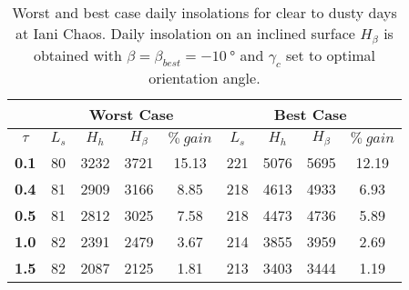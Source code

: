 \begin{table}[h]
\footnotesize
\centering
\caption[Worst and best case daily insolations for clear to dusty days at Iani Chaos]
{Worst and best case daily insolations for clear to dusty days at Iani Chaos. Daily insolation on an inclined surface $H_{\beta}$ is obtained with $\beta = \beta_{best} = \SI{-10}{\degree}$ and $\gamma_{c}$ set to optimal orientation angle.}
\label{tab:insolation-iani-chaos-clear-and-dusty-days}
\begin{tabular}{c|c|c|c|c|c|c|c|c|}
\cline{2-9}
\multicolumn{1}{l|}{} & \multicolumn{4}{c|}{\textbf{Worst Case}} & \multicolumn{4}{c|}{\textbf{Best Case}} \\ \hline
\multicolumn{1}{|c|}{$\tau$} & $L_{s}$ & $H_{h}$ & $H_{\beta}$ & $\%\:gain$ & $L_{s}$ & $H_{h}$ & $H_{\beta}$ & $\%\:gain$ \\ \hline
\multicolumn{1}{|c|}{\textbf{0.1}} & 80 & 3232 & 3721 & 15.13 & 221 & 5076 & 5695 & 12.19 \\ \hline
\multicolumn{1}{|c|}{\textbf{0.4}} & 81 & 2909 & 3166 & 8.85 & 218 & 4613 & 4933 & 6.93 \\ \hline
\multicolumn{1}{|c|}{\textbf{0.5}} & 81 & 2812 & 3025 & 7.58 & 218 & 4473 & 4736 & 5.89 \\ \hline
\multicolumn{1}{|c|}{\textbf{1.0}} & 82 & 2391 & 2479 & 3.67 & 214 & 3855 & 3959 & 2.69 \\ \hline
\multicolumn{1}{|c|}{\textbf{1.5}} & 82 & 2087 & 2125 & 1.81 & 213 & 3403 & 3444 & 1.19 \\ \hline
\end{tabular}
\end{table}
